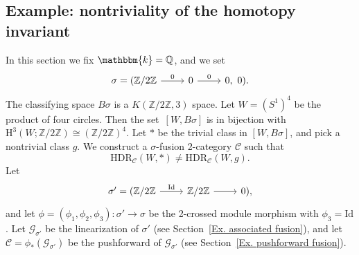 \documentclass[a4paper, oneside]{amsart}
\newcommand{\Z}{\mathbb{Z}}
\numberwithin{equation}{subsection}
\theoremstyle{referencedlemma}
\theoremstyle{plain} %
\theoremstyle{remark}
\begin{document}
\subsection{Example: nontriviality of the homotopy invariant}\label{Ex.nontrivial}In this section we fix $\mathbbm{k} = \mathbb{Q}$, and we set 
$$
\begin{tikzcd}
\sigma = (\Z/2\Z \arrow[r, "0"] & 0 \arrow[r, "0"] & 0, \ 0).
\end{tikzcd}
$$
The classifying space $B\sigma$ is a $K(\Z/2\Z, 3)$ space.  Let $W = (S^1)^4$ be the product of four circles.  Then the set~$[W, B\sigma]$ is in bijection with~$\mathrm{H}^3(W; \mathbb{Z}/2\mathbb{Z}) \cong (\mathbb{Z}/2\mathbb{Z})^4$. Let $*$ be the trivial class in $[W, B\sigma]$, and pick a nontrivial class $g$.  We construct a $\sigma$-fusion 2-category $\mathcal{C}$ such that 
$$
\mathrm{HDR}_\mathcal{C}(W,*) \neq \mathrm{HDR}_\mathcal{C}(W,g).
$$
Let 
$$
\begin{tikzcd}
\sigma' = (\mathbb{Z}/2\mathbb{Z} \arrow[r, "\mathrm{Id}"] & \mathbb{Z}/2\mathbb{Z} \arrow[r] & 0), 
\end{tikzcd}
$$
and let $\phi = (\phi_1, \phi_2, \phi_3) \colon \sigma' \to \sigma$ be the 2-crossed module morphism with $\phi_3 = \mathrm{Id}$.  Let $\mathcal{G}_{\sigma'}$ be the linearization of $\sigma'$ (see Section~\ref{Ex. associated fusion}), and let $\mathcal{C} = \phi_*(\mathcal{G}_{\sigma'})$ be the pushforward of $\mathcal{G}_{\sigma'}$ (see Section~\ref{Ex. pushforward fusion}).  
\end{document}
